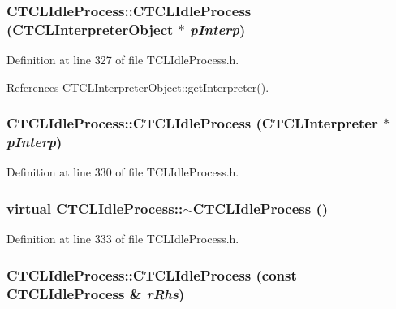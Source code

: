 \subsubsection{\setlength{\rightskip}{0pt plus 5cm}CTCLIdle\-Process::CTCLIdle\-Process ({\bf CTCLInterpreter\-Object} $\ast$ {\em p\-Interp})\hspace{0.3cm}{\tt  [inline]}}\label{classCTCLIdleProcess_a0}




Definition at line 327 of file TCLIdle\-Process.h.

References CTCLInterpreter\-Object::get\-Interpreter().
\subsubsection{\setlength{\rightskip}{0pt plus 5cm}CTCLIdle\-Process::CTCLIdle\-Process ({\bf CTCLInterpreter} $\ast$ {\em p\-Interp})\hspace{0.3cm}{\tt  [inline]}}\label{classCTCLIdleProcess_a1}




Definition at line 330 of file TCLIdle\-Process.h.
\subsubsection{\setlength{\rightskip}{0pt plus 5cm}virtual CTCLIdle\-Process::$\sim$CTCLIdle\-Process ()\hspace{0.3cm}{\tt  [inline, virtual]}}\label{classCTCLIdleProcess_a2}




Definition at line 333 of file TCLIdle\-Process.h.
\subsubsection{\setlength{\rightskip}{0pt plus 5cm}CTCLIdle\-Process::CTCLIdle\-Process (const CTCLIdle\-Process \& {\em r\-Rhs})\hspace{0.3cm}{\tt  [private]}}\label{classCTCLIdleProcess_c0}




